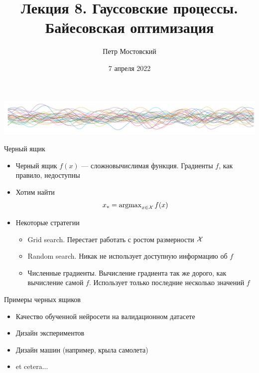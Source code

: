 \documentclass[fullscreen=true, bookmarks=true, hyperref={pdfencoding=unicode}]{beamer}
\title{Лекция 8. Гауссовские процессы.\\ Байесовская оптимизация}
\author{Петр Мостовский}
\institute{МКН СПбГУ}
\date{7 апреля 2022}
\begin{document}
\begin{frame}
    \transdissolve[duration=0.2]
    \titlepage
\end{frame}


\begin{frame}{}

    \centerline{\includegraphics[]{logo-samples.pdf}}

\end{frame}


\begin{frame}{Черный ящик}

\begin{itemize}
    \item<1-> Черный ящик $f(x)$ --- сложновычислимая функция. Градиенты $f$, как правило, недоступны
    \item<2-> Хотим найти
    \[
        x_{*} = \operatorname{argmax}_{x \in \mathcal{X}} f(x)
    \]
    \item<3-> Некоторые стратегии
        \begin{itemize}
            \item<4-> Grid search. Перестает работать с ростом размерности $\mathcal{X}$
            \item<5-> Random search. Никак не  использует доступную информацию об $f$
            \item<6-> Численные градиенты. Вычисление градиента так же дорого, как вычисление самой $f$. Использует только последние несколько значений $f$
        \end{itemize}
\end{itemize}

\end{frame}

\begin{frame}{Примеры черных ящиков}

\begin{itemize}
    \item<1-> Качество обученной нейросети на валидационном датасете
    \item<3-> Дизайн экспериментов
    \item<4-> Дизайн машин (например, крыла самолета)
    \item<5-> et cetera...
\end{itemize}

\end{frame}
\end{document}

